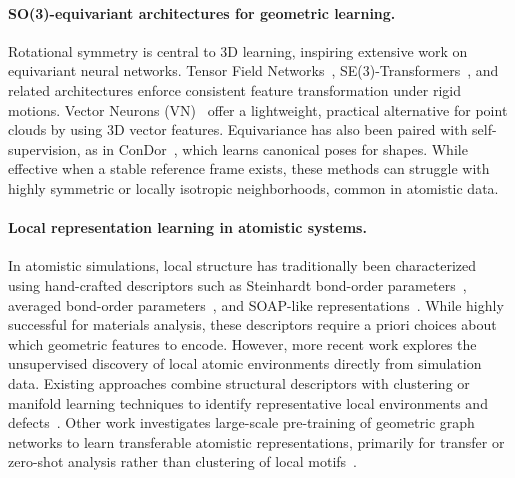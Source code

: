 \documentclass[runningheads]{llncs}
\begin{document}
\paragraph{SO(3)-equivariant architectures for geometric learning.}
Rotational symmetry is central to 3D learning, inspiring extensive work on equivariant neural networks. Tensor Field Networks~\cite{thomas2018tfn}, SE(3)-Transformers~\cite{fuchs2020se3transformer}, and related architectures enforce consistent feature transformation under rigid motions. Vector Neurons (VN)~\cite{Deng2021VN} offer a lightweight, practical alternative for point clouds by using 3D vector features. Equivariance has also been paired with self-supervision, as in ConDor~\cite{sajnani2022condor}, which learns canonical poses for shapes. While effective when a stable reference frame exists, these methods can struggle with highly symmetric or locally isotropic neighborhoods, common in atomistic data.

\paragraph{Local representation learning in atomistic systems.}
In atomistic simulations, local structure has traditionally been characterized using hand-crafted descriptors such as Steinhardt bond-order parameters~\cite{steinhardt1983bond}, averaged bond-order parameters~\cite{lechner2008accurate}, and SOAP-like representations~\cite{bartok2013representing}. While highly successful for materials analysis, these descriptors require a priori choices about which geometric features to encode. However, more recent work explores the unsupervised discovery of local atomic environments directly from simulation data. Existing approaches combine structural descriptors with clustering or manifold learning techniques to identify representative local environments and defects~\cite{zeni2021gold,becker2022atomic,becker2022nucleation,roncoroni2023representative,kyvala2025defects}. Other work investigates large-scale pre-training of geometric graph networks to learn transferable atomistic representations, primarily for transfer or zero-shot analysis rather than clustering of local motifs~\cite{pengmei2025pretraining}.
\end{document}
